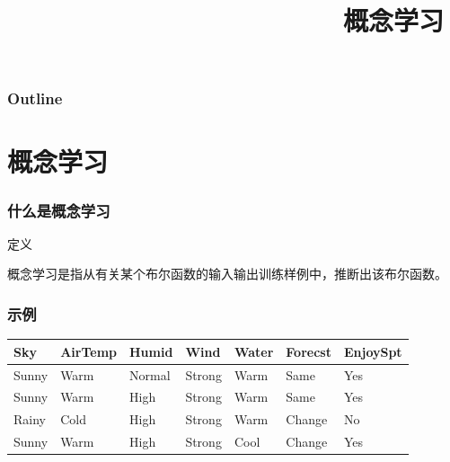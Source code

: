 \documentclass{beamer}
\title{概念学习}
\author{}
\date{}
\begin{document}
\maketitle

\begin{frame}
\frametitle{Outline}
\setcounter{tocdepth}{3}
\tableofcontents
\end{frame}











\section{概念学习}
\label{sec-1}
\begin{frame}
\frametitle{什么是概念学习}
\label{sec-1-1}
\begin{block}{定义}
\label{sec-1-1-1}

概念学习是指从有关某个布尔函数的输入输出训练样例中，推断出该布尔函数。
\end{block}
\end{frame}
\begin{frame}
\frametitle{示例}
\label{sec-1-2}


\begin{center}
\begin{tabular}{lllllll}
 Sky    &  AirTemp  &  Humid   &  Wind    &  Water  &  Forecst  &  EnjoySpt  \\
\hline
 Sunny  &  Warm     &  Normal  &  Strong  &  Warm   &  Same     &  Yes       \\
 Sunny  &  Warm     &  High    &  Strong  &  Warm   &  Same     &  Yes       \\
 Rainy  &  Cold     &  High    &  Strong  &  Warm   &  Change   &  No        \\
 Sunny  &  Warm     &  High    &  Strong  &  Cool   &  Change   &  Yes       \\
\end{tabular}
\end{center}
\end{frame}
\end{document}
